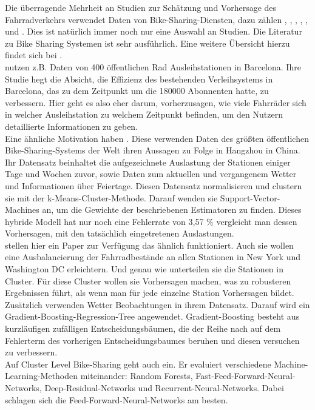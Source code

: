 \documentclass[a4paper,12pt]{thesis}
\begin{document}
Die überragende Mehrheit an Studien zur Schätzung und Vorhersage des Fahrradverkehrs verwendet Daten von Bike-Sharing-Diensten, dazu zählen \cite{Kaltenbrunner2010}, \cite{Xu2013}, \cite{Li2015}, \cite{Mitchell2018PredictingBT}, \cite{Colace2020}, \cite{Gao2022} und \cite{Li2022}. Dies ist natürlich immer noch nur eine Auswahl an Studien. Die Literatur zu Bike Sharing Systemen ist sehr ausführlich. Eine weitere Übersicht hierzu findet sich bei \cite{Mitchell2018PredictingBT}.\\
\cite{Kaltenbrunner2010} nutzen z.B. Daten von 400 öffentlichen Rad Ausleihstationen in Barcelona. Ihre Studie hegt die Absicht, die Effizienz des bestehenden Verleihsystems in Barcelona, das zu dem Zeitpunkt um die 180000 Abonnenten hatte, zu verbessern. Hier geht es also eher darum, vorherzusagen, wie viele Fahrräder sich in welcher Ausleihstation zu welchem Zeitpunkt befinden, um den Nutzern detaillierte Informationen zu geben.\\
Eine ähnliche Motivation haben \cite{Xu2013}. Diese verwenden Daten des größten öffentlichen Bike-Sharing-Systems der Welt ihren Aussagen zu Folge in Hangzhou in China. Ihr Datensatz beinhaltet die aufgezeichnete Auslastung der Stationen einiger Tage und Wochen zuvor, sowie Daten zum aktuellen und vergangenem Wetter und Informationen über Feiertage. Diesen Datensatz normalisieren und clustern sie mit der k-Means-Cluster-Methode. Darauf wenden sie Support-Vector-Machines an, um die Gewichte der beschriebenen Estimatoren zu finden. Dieses hybride Modell hat nur noch eine Fehlerrate von 3,57 \% vergleicht man dessen Vorhersagen, mit den tatsächlich eingetretenen Auslastungen.\\
\cite{Li2015} stellen hier ein Paper zur Verfügung das ähnlich funktioniert. Auch sie wollen eine Ausbalancierung der Fahrradbestände an allen Stationen in New York und Washington DC erleichtern. Und genau wie \cite{Xu2013} unterteilen sie die Stationen in Cluster. Für diese Cluster wollen sie Vorhersagen machen, was zu robusteren Ergebnissen führt, als wenn man für jede einzelne Station Vorhersagen bildet. Zusätzlich verwenden \cite{Li2015} Wetter Beobachtungen in ihrem Datensatz. Darauf wird ein Gradient-Boosting-Regression-Tree angewendet. Gradient-Boosting besteht aus kurzläufigen zufälligen Entscheidungsbäumen, die der Reihe nach auf dem Fehlerterm des vorherigen Entscheidungsbaumes beruhen und diesen versuchen zu verbessern.\\
Auf Cluster Level Bike-Sharing geht auch \cite{Mitchell2018PredictingBT} ein. Er evaluiert verschiedene Machine-Learning-Methoden miteinander: Random Forests, Fast-Feed-Forward-Neural-Networks, Deep-Residual-Networks und Recurrent-Neural-Networks.  Dabei schlagen sich die Feed-Forward-Neural-Networks am besten.\\
\end{document}

